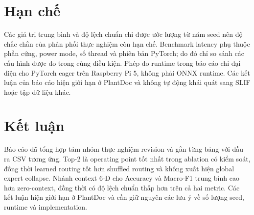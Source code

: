 \documentclass[conference]{IEEEtran}
\begin{document}
\section{Hạn chế}

Các giá trị trung bình và độ lệch chuẩn chỉ được ước lượng từ năm seed nên độ
chắc chắn của phân phối thực nghiệm còn hạn chế. Benchmark latency phụ thuộc
phần cứng, power mode, số thread và phiên bản PyTorch; do đó chỉ so sánh các
cấu hình được đo trong cùng điều kiện. Phép đo runtime trong báo cáo chỉ đại
diện cho PyTorch eager trên Raspberry Pi 5, không phải ONNX runtime. Các kết
luận của báo cáo hiện giới hạn ở PlantDoc và không tự động khái quát sang SLIF
hoặc tập dữ liệu khác.

\section{Kết luận}

Báo cáo đã tổng hợp tám nhóm thực nghiệm revision và gắn từng bảng với đầu ra
CSV tương ứng. Top-2 là operating point tốt nhất trong ablation có kiểm soát,
đồng thời learned routing tốt hơn shuffled routing và không xuất hiện global
expert collapse. Nhánh context 6-D cho Accuracy và Macro-F1 trung bình cao
hơn zero-context, đồng thời có độ lệch chuẩn thấp hơn trên cả hai metric. Các
kết luận hiện giới hạn ở PlantDoc và cần giữ nguyên các lưu ý về số lượng
seed, runtime và implementation.
\end{document}
